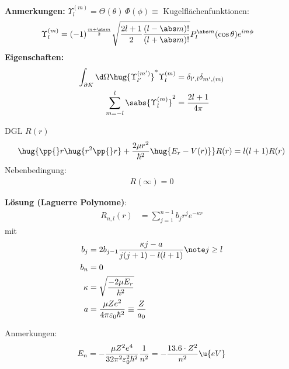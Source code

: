 \documentclass[twocolumn]{summery_4.1}
\begin{document}
\textbf{Anmerkungen:} \(\Upsilon_{l}^{(m)}=\Theta(\theta)\,\Phi(\phi) \equiv\) Kugelflächenfunktionen:
\begin{align*}
    \Upsilon_l^{(m)} &=  (-1)^{\frac{m+\abs m}{2}} \sqrt{\frac{2l +1}{2} \frac{(l - \abs m)!}{(l+\abs m)!}} P_l^{\abs m}(\cos\theta) e^{im\phi}
\end{align*}
\textbf{Eigenschaften:}
\begin{align*}
    \int_{\partial K} \d\Omega \hug{\Upsilon_{l'}^{(m')}}^* \Upsilon_{l}^{(m)} &= \delta_{l',l} \delta_{m',(m)} \\
    \sum_{m=-l}^l \sabs{\Upsilon_{l}^{(m)}}^2 &= \frac{2l + 1}{4\pi}
\end{align*}

{\large DGL $R(r)$}
\begin{align*}
    \hug{\pp{}r \hug{r^2\pp{}r} + \frac{2\mu r^2}{\hbar^2} \hug{E_r - V(r)}} R(r) = l(l+1) R(r)
\end{align*}
Nebenbedingung:
\begin{align*}
    R(\infty) =0
\end{align*}

\textbf{Lösung (Laguerre Polynome)}:
\begin{align*}
    R_{n,l}(r) &=  \sum_{j=1}^{n-1} b_j r^j e^{-\kappa r}
\end{align*}
mit 
\begin{align*}
    b_j &= 2b_{j-1} \frac{\kappa j - a}{j(j+1) - l (l+1)}\note j\ge l\\
    b_n &= 0\\ 
    \kappa &= \sqrt{\frac{-2\mu E_r}{\hbar^2}} \\
    a &= \frac{\mu Z e^2}{4\pi \varepsilon_0 \hbar^2} \equiv  \frac{Z}{a_0}\\
\end{align*}

Anmerkungen:
\begin{align*}
    E_n = -\frac{\mu Z^2 e^4}{32 \pi^2 \varepsilon_0^2 \hbar^2} \frac{1}{n^2} = - \frac{13.6\cdot Z^2}{n^2} \u{eV}
\end{align*}
\end{document}
